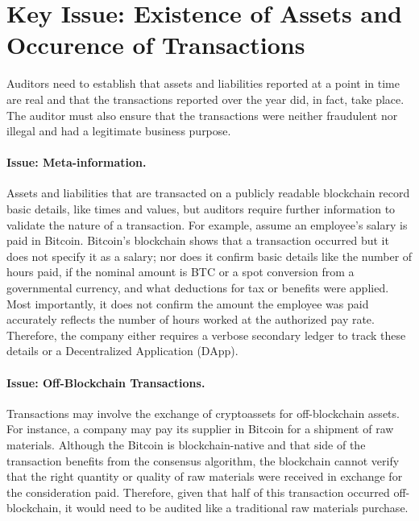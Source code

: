 \section{Key Issue: Existence of Assets and Occurence of Transactions}

Auditors need to establish that assets and liabilities reported at a point in time are real and that the transactions reported over the year did, in fact, take place. The auditor must also ensure that the transactions were neither fraudulent nor illegal and had a legitimate business purpose.  

\paragraph{Issue: Meta-information.} Assets and liabilities that are transacted on a publicly readable blockchain record basic details, like times and values, but auditors require further information to validate the nature of a transaction. For example, assume an employee{'}s salary is paid in Bitcoin. Bitcoin{'}s blockchain shows that a transaction occurred but it does not specify it as a salary; nor does it confirm basic details like the number of hours paid, if the nominal amount is BTC or a spot conversion from a governmental currency, and what deductions for tax or benefits were applied. Most importantly, it does not confirm the amount the employee was paid accurately reflects the number of hours worked at the authorized pay rate. Therefore, the company either requires a verbose secondary ledger to track these details or a Decentralized Application (DApp).

\paragraph{Issue: Off-Blockchain Transactions.} Transactions may involve the exchange of cryptoassets for off-blockchain assets. For instance, a company may pay its supplier in Bitcoin for a shipment of raw materials. Although the Bitcoin is blockchain-native and that side of the transaction benefits from the consensus algorithm, the blockchain cannot verify that the right quantity or quality of raw materials were received in exchange for the consideration paid. Therefore, given that half of this transaction occurred off-blockchain, it would need to be audited like a traditional raw materials purchase. 

